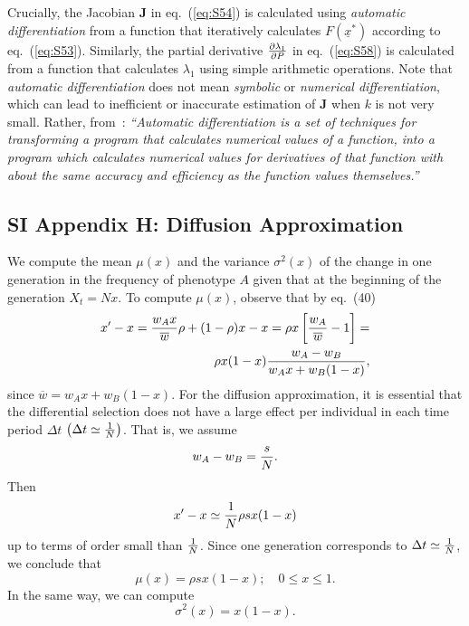 \documentclass[9pt, a4paper]{extarticle}
\newcommand{\cj}{\mathbf{J}}
\begin{document}
Crucially, the Jacobian $\cj$ in eq.~(\ref{eq:S54}) is calculated using {\sl automatic differentiation} from a function that iteratively calculates $F(\underline x^*)$ according to eq.~(\ref{eq:S53}). Similarly, the partial derivative ${\partial \lambda_1 \over \partial P}$ in eq.~(\ref{eq:S58}) is calculated from a function that calculates $\lambda_1$ using simple arithmetic operations.
Note that {\sl automatic differentiation} does not mean {\sl symbolic} or {\sl numerical differentiation}, which can lead to inefficient or inaccurate estimation of $\cj$ when $k$ is not very small. Rather, from~\citet{bartholomew2000}: 
{\sl ``Automatic differentiation is a set of techniques for transforming a program that calculates numerical values of a function, into a program which calculates numerical values for derivatives of that function with about the same accuracy and efficiency as the function values themselves.''}

\subsection*{SI Appendix H: Diffusion Approximation}

We compute the mean $\mu(x)$ and the variance $\sigma^2(x)$ of the change in one generation  in the frequency of phenotype $A$ given that at the beginning of the generation $X_t=Nx$.
To compute $\mu(x)$, observe that by eq.~(40)
 \begin{equation}
 \begin{aligned}
 x' -x =
 {w_Ax\over\overline w}\rho +(1-\rho)x -x =
 \rho x\left[{w_A\over \overline w}-1\right] = \\
 \rho x(1-x){w_A -w_B\over w_Ax +w_B(1-x)},
 \label{49}\end{aligned}\end{equation}
 since $\overline w =w_A x +w_B(1-x)$.
 For the diffusion approximation, it is essential that the differential selection does not have a large effect per individual in each time period  $\Delta t$ $\bigl(\Delta t\simeq{1\over N}\bigr)$. That is, we assume
 \begin{equation}
 w_A -w_B ={s\over N}.
 \label{50}\end{equation}
 Then
 \begin{equation}
 x'-x\simeq {1\over N}\rho sx(1-x)
 \label{51}\end{equation}
 up to terms of order small than ${1\over N}$. Since one generation corresponds to $\Delta t\simeq {1\over N}$, we  conclude that
 \begin{equation}
 \mu(x) =\rho sx(1-x);\quad 0\le x\le 1.
 \label{52}\end{equation}
 In the same way, we can compute 
  \begin{equation}
  \sigma^2(x) = x(1-x).
 \end{equation}




\end{document}
